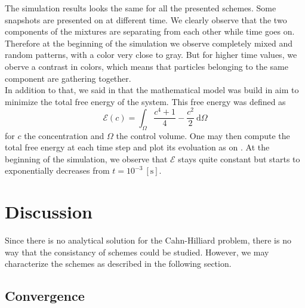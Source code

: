 \documentclass[10pt,a4paper,twocolumn]{article}
\begin{document}
The simulation results looks the same for all the presented schemes. Some snapshots are presented on  at different time. We clearly observe that the two components of the mixtures are separating from each other while time goes on. Therefore at the beginning of the simulation we observe completely mixed and random patterns, with a color very close to gray. But for higher time values, we oberve a contrast in colors, which means that particles belonging to the same component are gathering together.
\vspace{\baselineskip}\\
In addition to that, we said in  that the mathematical model was build in aim to minimize the total free energy of the system. This free energy was defined as
\begin{equation}
	\mathcal E(c) = \int_\Omega \frac{c^4 + 1}{4} - \frac{c^2}{2}\ \mathrm{d}\Omega
\end{equation}
for $c$ the concentration and $\Omega$ the control volume. One may then compute the total free energy at each time step and plot its evoluation as on . At the beginning of the simulation, we observe that $\mathcal E$ stays quite constant but starts to exponentially decreases from $t = 10^{-3}\ [\mathrm{s}]$.

\section{Discussion} %
\label{sec:discussion}

Since there is no analytical solution for the Cahn-Hilliard problem, there is no way that the consistancy of schemes could be studied. However, we may characterize the schemes as described in the following section.

\subsection{Convergence} %
\label{sub:convergence}
\end{document}
